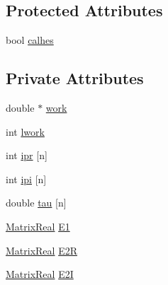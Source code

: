 \subsection*{Protected Attributes}
\begin{DoxyCompactItemize}
\item 
bool \hyperlink{classodes_1_1Matrices_3_01true_00_01true_00_01n_00_01nsub_00_01nsup_01_4_aea9e813e18fdb891846220218848e30f}{calhes}
\end{DoxyCompactItemize}
\subsection*{Private Attributes}
\begin{DoxyCompactItemize}
\item 
double $\ast$ \hyperlink{classodes_1_1Matrices_3_01true_00_01true_00_01n_00_01nsub_00_01nsup_01_4_a11aeb74270d9f8b97c708ef9bf226902}{work}
\item 
int \hyperlink{classodes_1_1Matrices_3_01true_00_01true_00_01n_00_01nsub_00_01nsup_01_4_a2baf43743a44b87d58721f54a25943a9}{lwork}
\item 
int \hyperlink{classodes_1_1Matrices_3_01true_00_01true_00_01n_00_01nsub_00_01nsup_01_4_aabee673416e9efcace8d863693484026}{ipr} \mbox{[}n\mbox{]}
\item 
int \hyperlink{classodes_1_1Matrices_3_01true_00_01true_00_01n_00_01nsub_00_01nsup_01_4_a007124102d8e6dd8bd2c8cfd6e457686}{ipi} \mbox{[}n\mbox{]}
\item 
double \hyperlink{classodes_1_1Matrices_3_01true_00_01true_00_01n_00_01nsub_00_01nsup_01_4_a77ab26be1470e62b364922691955a7b8}{tau} \mbox{[}n\mbox{]}
\item 
\hyperlink{classodes_1_1Matrices_3_01true_00_01true_00_01n_00_01nsub_00_01nsup_01_4_a9c13d85a737f0806d9cfff89d3d59c52}{Matrix\+Real} \hyperlink{classodes_1_1Matrices_3_01true_00_01true_00_01n_00_01nsub_00_01nsup_01_4_ab3bfa77eaa1898f5d2f4df4e99f52d3c}{E1}
\item 
\hyperlink{classodes_1_1Matrices_3_01true_00_01true_00_01n_00_01nsub_00_01nsup_01_4_a9c13d85a737f0806d9cfff89d3d59c52}{Matrix\+Real} \hyperlink{classodes_1_1Matrices_3_01true_00_01true_00_01n_00_01nsub_00_01nsup_01_4_a9d483886174270b6f19a1fae4ab151bc}{E2\+R}
\item 
\hyperlink{classodes_1_1Matrices_3_01true_00_01true_00_01n_00_01nsub_00_01nsup_01_4_a9c13d85a737f0806d9cfff89d3d59c52}{Matrix\+Real} \hyperlink{classodes_1_1Matrices_3_01true_00_01true_00_01n_00_01nsub_00_01nsup_01_4_a453b700b4f52c71243b25c845ee57700}{E2\+I}

\end{DoxyCompactItemize}
